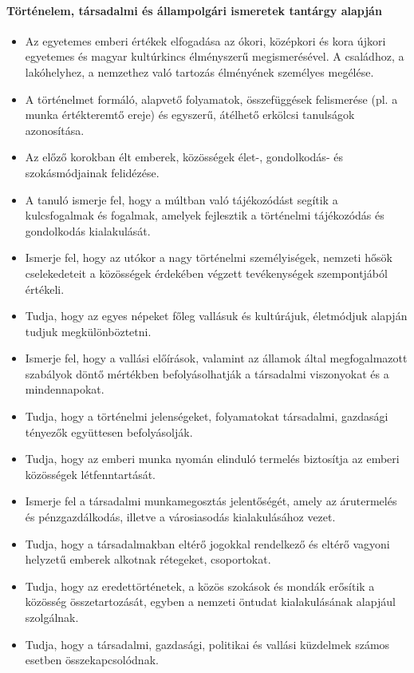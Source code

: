 \paragraph{Történelem, társadalmi és állampolgári ismeretek tantárgy alapján}
\begin{itemize}
\item Az egyetemes emberi értékek elfogadása az ókori, középkori és kora újkori egyetemes és magyar kultúrkincs élményszerű megismerésével. A családhoz, a lakóhelyhez, a nemzethez való tartozás élményének személyes megélése.
\item A történelmet formáló, alapvető folyamatok, összefüggések felismerése (pl. a munka értékteremtő ereje) és egyszerű, átélhető erkölcsi tanulságok azonosítása.
\item Az előző korokban élt emberek, közösségek élet-, gondolkodás- és szokásmódjainak felidézése.
\item A tanuló ismerje fel, hogy a múltban való tájékozódást segítik a kulcsfogalmak és fogalmak, amelyek fejlesztik a történelmi tájékozódás és gondolkodás kialakulását.
\item Ismerje fel, hogy az utókor a nagy történelmi személyiségek, nemzeti hősök cselekedeteit a közösségek érdekében végzett tevékenységek szempontjából értékeli.
\item Tudja, hogy az egyes népeket főleg vallásuk és kultúrájuk, életmódjuk alapján tudjuk megkülönböztetni.
\item Ismerje fel, hogy a vallási előírások, valamint az államok által megfogalmazott szabályok döntő mértékben befolyásolhatják a társadalmi viszonyokat és a mindennapokat.
\item Tudja, hogy a történelmi jelenségeket, folyamatokat társadalmi, gazdasági tényezők együttesen befolyásolják.
\item Tudja, hogy az emberi munka nyomán elinduló termelés biztosítja az emberi közösségek létfenntartását.
\item Ismerje fel a társadalmi munkamegosztás jelentőségét, amely az árutermelés és pénzgazdálkodás, illetve a városiasodás kialakulásához vezet.
\item Tudja, hogy a társadalmakban eltérő jogokkal rendelkező és eltérő vagyoni helyzetű emberek alkotnak rétegeket, csoportokat.
\item Tudja, hogy az eredettörténetek, a közös szokások és mondák erősítik a közösség összetartozását, egyben a nemzeti öntudat kialakulásának alapjául szolgálnak.
\item Tudja, hogy a társadalmi, gazdasági, politikai és vallási küzdelmek számos esetben összekapcsolódnak.

\end{itemize}
